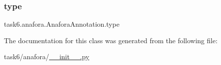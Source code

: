 \subsubsection{\texorpdfstring{type}{type}}
{\footnotesize\ttfamily task6.\+anafora.\+Anafora\+Annotation.\+type}



The documentation for this class was generated from the following file\+:\begin{DoxyCompactItemize}
\item 
task6/anafora/\hyperlink{task6_2anafora_2____init_____8py}{\+\_\+\+\_\+init\+\_\+\+\_\+.\+py}\end{DoxyCompactItemize}
